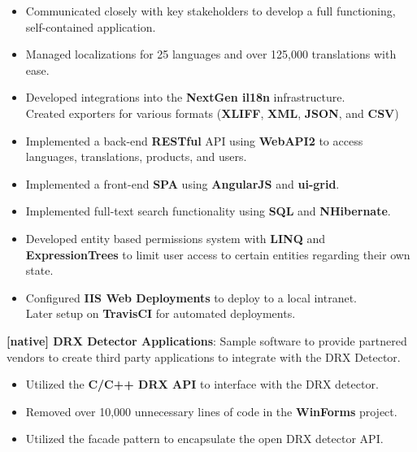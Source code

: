 \documentclass[letterpaper,11pt]{article}
\newcommand{\rProj}[3]{
  \item\small{
    \textbf{[#1] #2}{: #3 \vspace{-2pt}}
  }
}
\newcommand{\rRespListStart}{\begin{itemize}[label={-}]}
\newcommand{\rResp}[1]{
  \item\small{
    \textmd{#1 \vspace{0em}}
  }
}
\newcommand{\rRespListEnd}{\end{itemize}\vspace{.25em}}
\begin{document}
    \rRespListStart
      \rResp {Communicated closely with key stakeholders to develop a full
                functioning, self-contained application.}

      \rResp {Managed localizations for 25 languages and over 125,000
        translations with ease.}

      \rResp {Developed integrations into the \textbf{NextGen il18n}
                infrastructure. \\
              Created exporters for various formats
                (\textbf{XLIFF}, \textbf{XML}, \textbf{JSON}, and \textbf{CSV})}

      \rResp {Implemented a back-end \textbf{RESTful} API using
                \textbf{WebAPI2} to access languages, translations, products,
                and users.}

      \rResp {Implemented a front-end \textbf{SPA} using \textbf{AngularJS} and
                \textbf{ui-grid}.}

      \rResp {Implemented full-text search functionality using \textbf{SQL} and
                \textbf{NHibernate}.}

      \rResp {Developed entity based permissions system with \textbf{LINQ} and
                \textbf{ExpressionTrees} to limit user access to certain entities
                regarding their own state.}

      \rResp {Configured \textbf{IIS Web Deployments} to deploy to a local
                intranet. \\
              Later setup on \textbf{TravisCI} for automated deployments.}
    \rRespListEnd

    \rProj {native} {DRX Detector Applications} {Sample software to provide
                                                   partnered vendors to
                                                   create third party
                                                   applications to integrate
                                                   with the DRX Detector.}
    \rRespListStart
      \rResp {Utilized the \textbf{C/C++ DRX API} to interface with the DRX
                detector.}

      \rResp {Removed over 10,000 unnecessary lines of code in the
                \textbf{WinForms} project.}

      \rResp {Utilized the facade pattern to encapsulate the open DRX detector
                API.}
    \rRespListEnd
\end{document}
